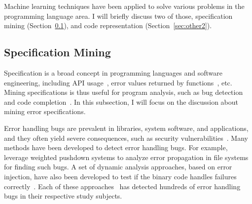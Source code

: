\documentclass[12pt]{report}	%
\begin{document}
Machine learning techniques have been applied to solve various problems in the programming language area.
I will briefly discuss two of those,
specification mining (Section~\ref{sec:other1}),
and code representation (Section~\ref{sec:other2}).

\subsection{Specification Mining}
\label{sec:other1}

Specification is a broad concept in programming languages and software engineering,
including API usage~\cite{zhong2009mapo,nguyen2014statistical,buse2012synthesizing}, 
error values returned by functions~\cite{marinescu2011efficient,Kang:2016:AAI:2970276.2970354,Acharya:2009:MAE}, etc.
Mining specifications is thus useful for program analysis,
such as bug detection~\cite{jana2016automatically} and code completion~\cite{hou2010towards}.
%
In this subsection, I will focus on the discussion about mining error specifications.

Error handling bugs are prevalent in libraries, system software, and
applications, and they often yield severe consequences, such as
security vulnerabilities~\cite{OWASP2007}.
%
Many methods have been developed to detect
error handling bugs. 
%
For example, \cite{Rubio-Gonzalez:2009:EPA:1542476.1542506} leverage weighted pushdown systems to analyze error propagation in file systems
for finding such bugs.
A set of dynamic analysis approaches, based on error injection, have also been developed 
to test if the binary code handles
failures correctly~\cite{marinescu2011efficient,susskraut2006automatically,gunawi2008eio}.
%
Each of these approaches~\cite{jana2016automatically,Rubio-Gonzalez:2009:EPA:1542476.1542506,gunawi2008eio} 
has detected hundreds of error handling bugs in their respective study subjects.
\end{document}
